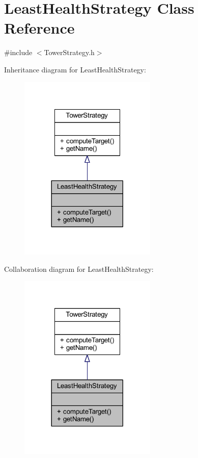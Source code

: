 \hypertarget{class_least_health_strategy}{\section{Least\+Health\+Strategy Class Reference}
\label{class_least_health_strategy}
}


{\ttfamily \#include $<$Tower\+Strategy.\+h$>$}



Inheritance diagram for Least\+Health\+Strategy\+:
\nopagebreak
\begin{figure}[H]
\begin{center}
\leavevmode
\includegraphics[width=185pt]{class_least_health_strategy__inherit__graph}
\end{center}
\end{figure}


Collaboration diagram for Least\+Health\+Strategy\+:
\nopagebreak
\begin{figure}[H]
\begin{center}
\leavevmode
\includegraphics[width=185pt]{class_least_health_strategy__coll__graph}
\end{center}
\end{figure}
